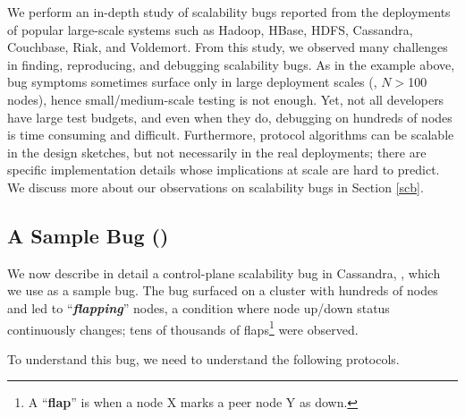 We perform an in-depth study of
\totAll scalability bugs reported from the deployments
of popular large-scale systems such as
Hadoop,
HBase,
HDFS,
Cassandra,
Couchbase,
Riak, and
Voldemort.
%
From this study, we observed many challenges in finding, reproducing, and
debugging scalability bugs.
%
As in the example above, bug symptoms sometimes surface only in large
deployment scales (\eg, $N$$>$100 nodes), hence small/medium-scale testing
is not enough.  Yet, not all developers have large test budgets, and even
when they do, debugging on hundreds of nodes is time consuming and
difficult.
%
Furthermore, protocol algorithms can be scalable in the design sketches,
but not necessarily in the real deployments; there are specific
implementation details whose implications at scale are hard to predict. We
discuss more about our observations on scalability bugs in Section \ref{scb}.



\subsection{A Sample Bug (\caone)}
\label{mot-bug}



We now describe in detail a control-plane scalability bug in
Cassandra,  \cite{CA-One}, 
which we use as a sample bug.
%
The bug surfaced on a cluster with hundreds of nodes and led to
``\textit{\textbf{flapping}}'' nodes, a condition where node up/down
status continuously changes;  tens of thousands of flaps\footnote{A 
``\textbf{flap}''
  is when a node X marks a peer node Y as down.}  were observed.




To understand this bug, we need to understand the following protocols.

